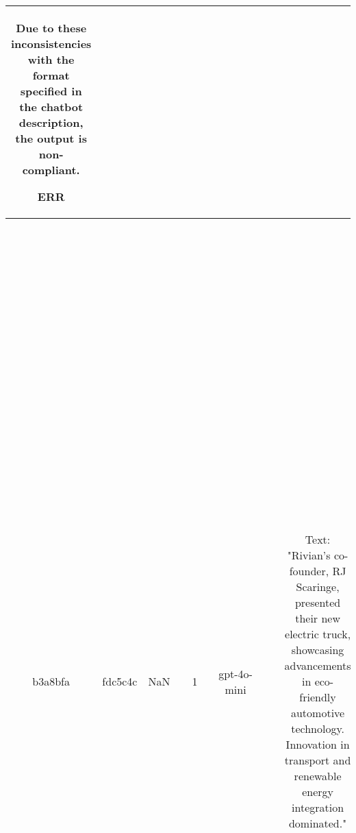\begin{table}[h!]
\begin{tabular}{|c|c|c|c|c|c|c|c|c|c|c|}
Due to these inconsistencies with the format specified in the chatbot description, the output is non-compliant.

ERR\\
\hline
b3a8bfa & fdc5c4c & NaN &  & 1 & gpt-4o-mini &  & Text: "Rivian's co-founder, RJ Scaringe, presented their new electric truck, showcasing advancements in eco-friendly automotive technology. Innovation in transport and renewable energy integration dominated." & Company names: Rivian  
People names: RJ Scaringe  
Specific topics: electric truck, eco-friendly automotive technology, innovation in transport, renewable energy integration  
General themes: sustainability, innovation in transportation, advancements in technology & ok & The chatbot output seems to comply with the desired format specified in the description. The output provides distinct categories with a colon followed by relevant items in a comma-separated list or a single entry if applicable. Specifically, the output includes:

1. "Company names" which is followed by a company name.
2. "People names" which is followed by a person’s name.
3. "Specific topics" include specific subjects/areas.
4. "General themes" which includes broader thematic concepts.

The chatbot output adheres to the structure and components described, without requiring any specific input context for evaluation.

OK\\
\hline
b3a8bfa & fdc5c4c & NaN &  & 1 & gemma2:9b &  & Text: "Rivian's co-founder, RJ Scaringe, presented their new electric truck, showcasing advancements in eco-friendly automotive technology. Innovation in transport and renewable energy integration dominated." & Here's a breakdown of the text according to your desired format:

**Company names:** Rivian 
**People names:** RJ Scaringe
**Specific topics:** electric trucks, eco-friendly automotive technology, transport innovation, renewable energy integration  
**General themes:** Automotive innovation, sustainability in transportation  


Let me know if you'd like me to analyze any other text! 
 & ok & The given chatbot output does comply with the format specified in the description. Here is my reasoning:

- The output provides a list of "Company names," with the format using a colon followed by the company name(s), as required. The company name "Rivian" follows immediately after the colon.


\end{tabular}
\end{table}
